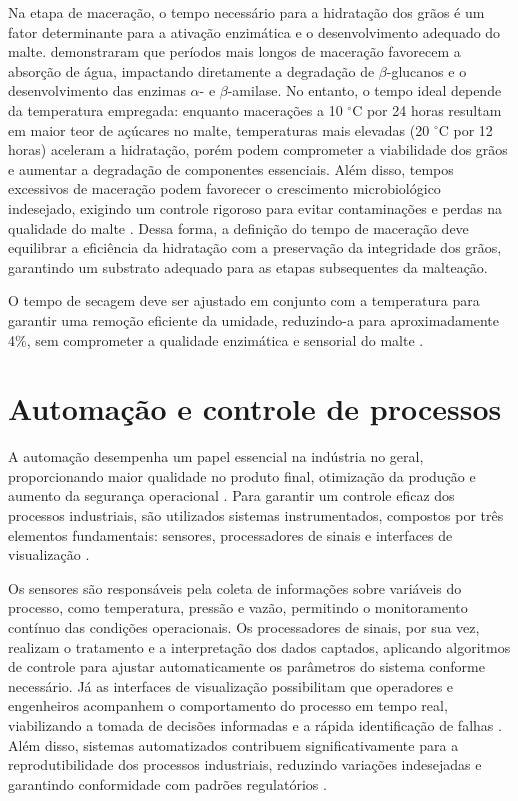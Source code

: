 Na etapa de maceração, o tempo necessário para a hidratação dos grãos é um fator determinante para a ativação enzimática e o desenvolvimento adequado do malte.  demonstraram que períodos mais longos de maceração favorecem a absorção de água, impactando diretamente a degradação de $\beta$-glucanos e o desenvolvimento das enzimas $\alpha$- e $\beta$-amilase. No entanto, o tempo ideal depende da temperatura empregada: enquanto macerações a 10 $^{\circ}$C por 24 horas resultam em maior teor de açúcares no malte, temperaturas mais elevadas (20 $^{\circ}$C por 12 horas) aceleram a hidratação, porém podem comprometer a viabilidade dos grãos e aumentar a degradação de componentes essenciais. Além disso, tempos excessivos de maceração podem favorecer o crescimento microbiológico indesejado, exigindo um controle rigoroso para evitar contaminações e perdas na qualidade do malte \cite{LUARASI2016}. Dessa forma, a definição do tempo de maceração deve equilibrar a eficiência da hidratação com a preservação da integridade dos grãos, garantindo um substrato adequado para as etapas subsequentes da malteação.

O tempo de secagem deve ser ajustado em conjunto com a temperatura para garantir uma remoção eficiente da umidade, reduzindo-a para aproximadamente 4\%, sem comprometer a qualidade enzimática e sensorial do malte \cite{LEWIS2012}.



\section{Automação e controle de processos}

A automação desempenha um papel essencial na indústria no geral, proporcionando maior qualidade no produto final, otimização da produção e aumento da segurança operacional \cite{SEBORG2016}. Para garantir um controle eficaz dos processos industriais, são utilizados sistemas instrumentados, compostos por três elementos fundamentais: sensores, processadores de sinais e interfaces de visualização \cite{BOLTON2021}. 

Os sensores são responsáveis pela coleta de informações sobre variáveis do processo, como temperatura, pressão e vazão, permitindo o monitoramento contínuo das condições operacionais. Os processadores de sinais, por sua vez, realizam o tratamento e a interpretação dos dados captados, aplicando algoritmos de controle para ajustar automaticamente os parâmetros do sistema conforme necessário. Já as interfaces de visualização possibilitam que operadores e engenheiros acompanhem o comportamento do processo em tempo real, viabilizando a tomada de decisões informadas e a rápida identificação de falhas \cite{BOLTON2021}. Além disso, sistemas automatizados contribuem significativamente para a reprodutibilidade dos processos industriais, reduzindo variações indesejadas e garantindo conformidade com padrões regulatórios \cite{SEBORG2016}.

